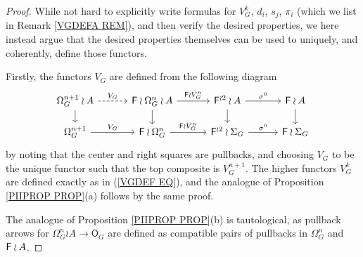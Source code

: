 \documentclass[a4paper,10pt]{article}%
\begin{document}
\begin{proof}
While not hard to explicitly write formulas for $V_G^k$, $d_i$, $s_j$, $\pi_i$ (which we list in Remark \ref{VGDEFA REM}),
and then verify the desired properties,
we here instead argue that the desired properties themselves can be used to uniquely, and coherently, define those functors. 

Firstly, the functors $V_G$ are defined from the following diagram
\begin{equation}\label{ALLSQUARES2 EQ}
\begin{tikzcd}[row sep = 1.3em,column sep = 3em]
	\Omega_{G}^{n+1} \wr A \ar[dashed]{r}{V_G} \ar{d}& 
	\Fin \wr \Omega_G^n \wr A \ar{r}{\Fin \wr V_{G}^n} \ar{d}&
	\Fin^{\wr 2} \wr A  \ar{d} \ar{r}{\sigma^0} &
	\Fin \wr A \ar{d}
\\
	\Omega_{G}^{n+1} \ar{r}{V_G} &
	\Fin \wr \Omega_{G}^{n} \ar{r}{\Fin \wr V_{G}^{n}} &
	\Fin^{\wr 2} \wr \Sigma_G \ar{r}{\sigma^0} &
	\Fin \wr \Sigma_G
\end{tikzcd}
\end{equation}
by noting that the center and right squares are pullbacks, 
and choosing $V_G$ to be the unique functor such that the top composite is $V_G^{n+1}.$
The higher functors $V_G^k$ are defined exactly as in (\ref{VGDEF EQ}), and the analogue of Proposition \ref{PIIPROP PROP}(a) follows by the same proof.

The analogue of Proposition \ref{PIIPROP PROP}(b) is tautological, as pullback arrows for 
$\Omega_G^n \wr A \to \mathsf{O}_G$
are defined as compatible pairs of pullbacks in 
$\Omega_G^n$ and $\mathsf{F} \wr A$.


\end{proof}
\end{document}
